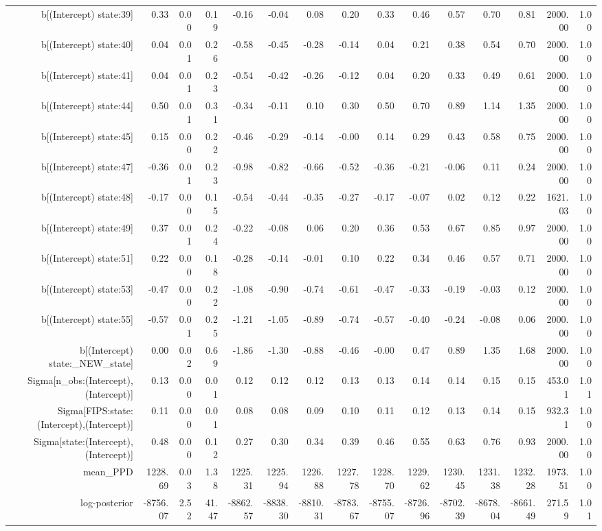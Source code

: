 \begin{table}[ht]
\begin{tabular}{rrrrrrrrrrrrrrr}
  b[(Intercept) state:39] & 0.33 & 0.00 & 0.19 & -0.16 & -0.04 & 0.08 & 0.20 & 0.33 & 0.46 & 0.57 & 0.70 & 0.81 & 2000.00 & 1.00 \\ 
  b[(Intercept) state:40] & 0.04 & 0.01 & 0.26 & -0.58 & -0.45 & -0.28 & -0.14 & 0.04 & 0.21 & 0.38 & 0.54 & 0.70 & 2000.00 & 1.00 \\ 
  b[(Intercept) state:41] & 0.04 & 0.01 & 0.23 & -0.54 & -0.42 & -0.26 & -0.12 & 0.04 & 0.20 & 0.33 & 0.49 & 0.61 & 2000.00 & 1.00 \\ 
  b[(Intercept) state:44] & 0.50 & 0.01 & 0.31 & -0.34 & -0.11 & 0.10 & 0.30 & 0.50 & 0.70 & 0.89 & 1.14 & 1.35 & 2000.00 & 1.00 \\ 
  b[(Intercept) state:45] & 0.15 & 0.00 & 0.22 & -0.46 & -0.29 & -0.14 & -0.00 & 0.14 & 0.29 & 0.43 & 0.58 & 0.75 & 2000.00 & 1.00 \\ 
  b[(Intercept) state:47] & -0.36 & 0.01 & 0.23 & -0.98 & -0.82 & -0.66 & -0.52 & -0.36 & -0.21 & -0.06 & 0.11 & 0.24 & 2000.00 & 1.00 \\ 
  b[(Intercept) state:48] & -0.17 & 0.00 & 0.15 & -0.54 & -0.44 & -0.35 & -0.27 & -0.17 & -0.07 & 0.02 & 0.12 & 0.22 & 1621.03 & 1.00 \\ 
  b[(Intercept) state:49] & 0.37 & 0.01 & 0.24 & -0.22 & -0.08 & 0.06 & 0.20 & 0.36 & 0.53 & 0.67 & 0.85 & 0.97 & 2000.00 & 1.00 \\ 
  b[(Intercept) state:51] & 0.22 & 0.00 & 0.18 & -0.28 & -0.14 & -0.01 & 0.10 & 0.22 & 0.34 & 0.46 & 0.57 & 0.71 & 2000.00 & 1.00 \\ 
  b[(Intercept) state:53] & -0.47 & 0.00 & 0.22 & -1.08 & -0.90 & -0.74 & -0.61 & -0.47 & -0.33 & -0.19 & -0.03 & 0.12 & 2000.00 & 1.00 \\ 
  b[(Intercept) state:55] & -0.57 & 0.01 & 0.25 & -1.21 & -1.05 & -0.89 & -0.74 & -0.57 & -0.40 & -0.24 & -0.08 & 0.06 & 2000.00 & 1.00 \\ 
  b[(Intercept) state:\_NEW\_state] & 0.00 & 0.02 & 0.69 & -1.86 & -1.30 & -0.88 & -0.46 & -0.00 & 0.47 & 0.89 & 1.35 & 1.68 & 2000.00 & 1.00 \\ 
  Sigma[n\_obs:(Intercept),(Intercept)] & 0.13 & 0.00 & 0.01 & 0.12 & 0.12 & 0.12 & 0.13 & 0.13 & 0.14 & 0.14 & 0.15 & 0.15 & 453.01 & 1.01 \\ 
  Sigma[FIPS:state:(Intercept),(Intercept)] & 0.11 & 0.00 & 0.01 & 0.08 & 0.08 & 0.09 & 0.10 & 0.11 & 0.12 & 0.13 & 0.14 & 0.15 & 932.31 & 1.00 \\ 
  Sigma[state:(Intercept),(Intercept)] & 0.48 & 0.00 & 0.12 & 0.27 & 0.30 & 0.34 & 0.39 & 0.46 & 0.55 & 0.63 & 0.76 & 0.93 & 2000.00 & 1.00 \\ 
  mean\_PPD & 1228.69 & 0.03 & 1.38 & 1225.31 & 1225.94 & 1226.88 & 1227.78 & 1228.70 & 1229.62 & 1230.45 & 1231.38 & 1232.28 & 1973.51 & 1.00 \\ 
  log-posterior & -8756.07 & 2.52 & 41.47 & -8862.57 & -8838.30 & -8810.31 & -8783.67 & -8755.07 & -8726.96 & -8702.39 & -8678.04 & -8661.49 & 271.59 & 1.01 \\ 
   \hline
\end{tabular}
\end{table}
